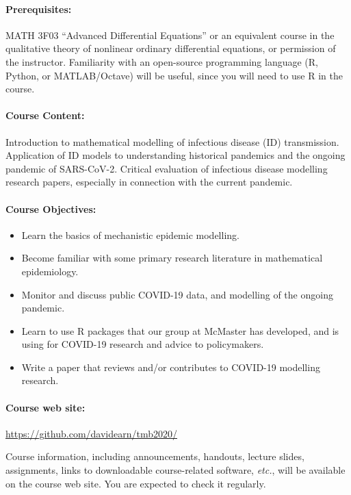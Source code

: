 \documentclass[12pt]{article}
\begin{document}
\paragraph*{Prerequisites:} MATH 3F03 ``Advanced Differential
Equations'' or an equivalent course in the qualitative theory of
nonlinear ordinary differential equations, or permission of the
instructor.  Familiarity with an open-source programming language (R,
Python, or MATLAB/Octave) will be useful, since you will need to use
R in the course.

\paragraph*{Course Content:}

Introduction to mathematical modelling of infectious disease (ID)
transmission.  Application of ID models to understanding historical
pandemics and the ongoing pandemic of SARS-CoV-2.  Critical evaluation
of infectious disease modelling research papers, especially in
connection with the current pandemic.

\paragraph*{Course Objectives:}

\begin{itemize}
\item Learn the basics of mechanistic epidemic modelling.
\item Become familiar with some primary research literature in
  mathematical epidemiology. 
\item Monitor and discuss public COVID-19 data, and modelling of the ongoing pandemic.
\item Learn to use R packages that our group at McMaster has developed,
  and is using for COVID-19 research and advice to policymakers.
\item Write a paper that reviews and/or contributes to COVID-19
  modelling research.
\end{itemize}

\paragraph*{Course web site:} \url{https://github.com/davidearn/tmb2020/}

\noindent
Course information, including announcements, handouts, lecture slides, assignments, links to downloadable course-related software, {\it etc.\/}, will be available on the course web site.  You are expected to check it regularly.
\end{document}
